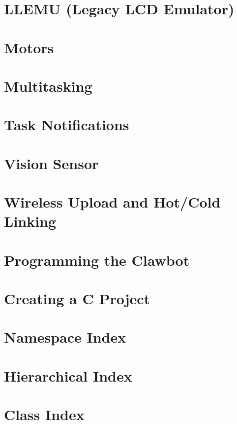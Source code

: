 \documentclass[twoside]{book}
\newcommand{\+}{\discretionary{\mbox{\scriptsize$\hookleftarrow$}}{}{}}
\begin{document}
\chapter{L\+L\+E\+MU (Legacy L\+CD Emulator)}
\label{autotoc_md59}

\chapter{Motors}
\label{autotoc_md63}

\chapter{Multitasking}
\label{autotoc_md71}

\chapter{Task Notifications}
\label{autotoc_md77}

\chapter{Vision Sensor}
\label{autotoc_md78}

\chapter{Wireless Upload and Hot/\+Cold Linking}
\label{autotoc_md85}

\chapter{Programming the Clawbot}
\label{autotoc_md88}

\chapter{Creating a C Project}
\label{autotoc_md103}

\chapter{Namespace Index}

\chapter{Hierarchical Index}

\chapter{Class Index}

\end{document}
